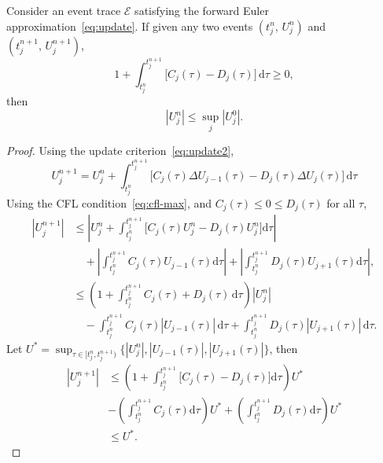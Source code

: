 \begin{theorem}
Consider an event trace $\mathcal{E}$ satisfying the forward Euler approximation~\eqref{eq:update}. If given any two events $(t_j^n,\,U_j^n)$ and $(t_j^{n+1},\,U_j^{n+1})$,
\begin{equation}
1 + \int_{t_j^n}^{t_j^{n+1}} \big[ C_j(\tau) - D_j(\tau) \big] \,\mathrm{d}\tau \ge 0,
\label{eq:cfl-max}
\end{equation}
then
\begin{equation*}
|U^n_j| \le \sup_j |U^0_j|.
\end{equation*}
\label{thm:max}
\end{theorem}
\begin{proof}
Using the update criterion~\eqref{eq:update2},
\begin{equation*}
U^{n+1}_j = U_j^n + \int_{t_j^n}^{t_j^{n+1}} \big[ C_j(\tau) \Delta U_{j-1}(\tau) -D_j(\tau) \Delta U_j(\tau) \big] \, \mathrm{d}\tau
\end{equation*}
Using the CFL condition~\eqref{eq:cfl-max}, and $C_j(\tau) \le 0 \le D_j(\tau)$ for all $\tau$,
\begin{align*}
\left| U^{n+1}_j \right| & \le
\left| U_j^n + \int_{t^n_j}^{t^{n+1}_j} \big[ C_j(\tau) U_j^n - D_j(\tau)  U_j^n \big] \mathrm{d} \tau \right| \\
& \quad + \left| \int_{t^n_j}^{t^{n+1}_j} C_j(\tau) U_{j-1}(\tau) \mathrm{d} \tau \right| + \left| \int_{t^n_j}^{t^{n+1}_j} D_j(\tau) U_{j+1}(\tau) \mathrm{d} \tau \right|,\\
& \le \left( 1+ \int_{t^n_j}^{t^{n+1}_j} C_j(\tau)  + D_j(\tau) \, \mathrm{d} \tau \right) |U_j^n|\\
& \quad - \int_{t^n_j}^{t^{n+1}_j} C_j(\tau) |U_{j-1}(\tau)| \,\mathrm{d}\tau + \int_{t^n_j}^{t^{n+1}_j} D_j(\tau) |U_{j+1}(\tau)| \,\mathrm{d}\tau.
\end{align*}
Let $U^* = \sup_{\tau \in [t_j^n,t_j^{n+1})} \{ |U_j^n|, |U_{j-1}(\tau)|, |U_{j+1}(\tau)| \}$, then \
\begin{align*}
|U^{n+1}_j| & \le \left( 1 + \int_{t_j^n}^{t_j^{n+1}} \big[ C_j(\tau) - D_j(\tau) \big]\mathrm{d} \tau \right) U^* \\
& - \left(  \int_{t_j^n}^{t_j^{n+1}} C_j(\tau) \mathrm{d} \tau \right) U^* + \left(  \int_{t_j^n}^{t_j^{n+1}} D_j(\tau) \mathrm{d} \tau \right) U^*\\
& \le U^*.
\end{align*}


\end{proof}
